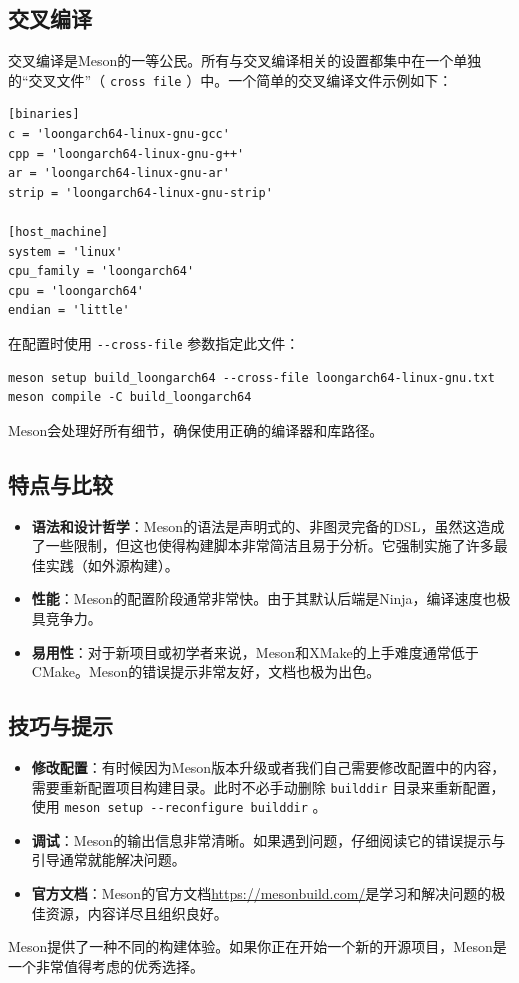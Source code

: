 \subsection{交叉编译}
交叉编译是Meson的一等公民。所有与交叉编译相关的设置都集中在一个单独的“交叉文件”（ \verb|cross file| ）中。一个简单的交叉编译文件示例如下：
\begin{verbatim}
[binaries]
c = 'loongarch64-linux-gnu-gcc'
cpp = 'loongarch64-linux-gnu-g++'
ar = 'loongarch64-linux-gnu-ar'
strip = 'loongarch64-linux-gnu-strip'

[host_machine]
system = 'linux'
cpu_family = 'loongarch64'
cpu = 'loongarch64'
endian = 'little'
\end{verbatim}

在配置时使用 \verb|--cross-file| 参数指定此文件：
\begin{verbatim}
meson setup build_loongarch64 --cross-file loongarch64-linux-gnu.txt
meson compile -C build_loongarch64
\end{verbatim}
Meson会处理好所有细节，确保使用正确的编译器和库路径。

\subsection{特点与比较}
\begin{itemize}
    \item \textbf{语法和设计哲学}：Meson的语法是声明式的、非图灵完备的DSL，虽然这造成了一些限制，但这也使得构建脚本非常简洁且易于分析。它强制实施了许多最佳实践（如外源构建）。
    \item \textbf{性能}：Meson的配置阶段通常非常快。由于其默认后端是Ninja，编译速度也极具竞争力。
    \item \textbf{易用性}：对于新项目或初学者来说，Meson和XMake的上手难度通常低于CMake。Meson的错误提示非常友好，文档也极为出色。
\end{itemize}

\subsection{技巧与提示}
\begin{itemize}
    \item \textbf{修改配置}：有时候因为Meson版本升级或者我们自己需要修改配置中的内容，需要重新配置项目构建目录。此时不必手动删除 \verb|builddir| 目录来重新配置，使用 \verb|meson setup --reconfigure builddir| 。
    \item \textbf{调试}：Meson的输出信息非常清晰。如果遇到问题，仔细阅读它的错误提示与引导通常就能解决问题。
    \item \textbf{官方文档}：Meson的官方文档\url{https://mesonbuild.com/}是学习和解决问题的极佳资源，内容详尽且组织良好。
\end{itemize}

Meson提供了一种不同的构建体验。如果你正在开始一个新的开源项目，Meson是一个非常值得考虑的优秀选择。
